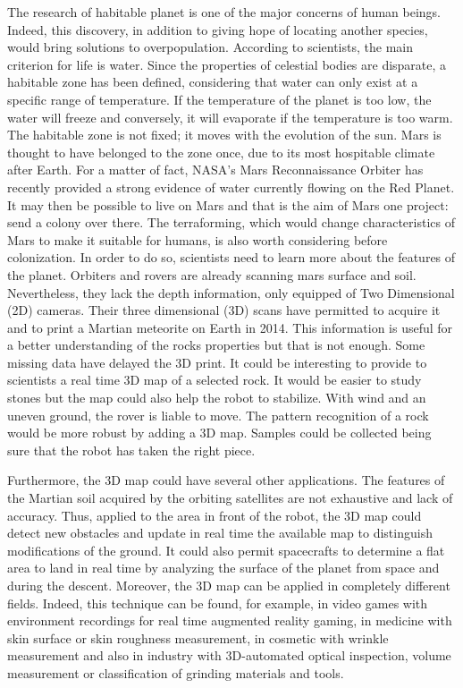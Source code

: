 The research of habitable planet is one of the major concerns of human beings. Indeed, this discovery, in addition to giving hope of locating another species, would bring solutions to overpopulation. According to scientists, the main criterion for life is water. Since the properties of celestial bodies are disparate, a habitable zone has been defined, considering that water can only exist at a specific range of temperature. If the temperature of the planet is too low, the water will freeze and conversely, it will evaporate if the temperature is too warm. The habitable zone is not fixed; it moves with the evolution of the sun. Mars is thought to have belonged to the zone once, due to its most hospitable climate after Earth. For a matter of fact, NASA's Mars Reconnaissance Orbiter has recently provided a strong evidence of water currently flowing on the Red Planet. It may then be possible to live on Mars and that is the aim of Mars one project: send a colony over there. The terraforming, which would change characteristics of Mars to make it suitable for humans, is also worth considering before colonization. In order to do so, scientists need to learn more about the features of the planet. Orbiters and rovers are already scanning mars surface and soil. Nevertheless, they lack the depth information, only equipped of Two Dimensional (2D) cameras. Their three dimensional (3D) scans have permitted to acquire it and to print a Martian meteorite on Earth in 2014. This information is useful for a better understanding of the rocks properties but that is not enough. Some missing data have delayed the 3D print. It could be interesting to provide to scientists a real time 3D map of a selected rock. It would be easier to study stones but the map could also help the robot to stabilize. With wind and an uneven ground, the rover is liable to move. The pattern recognition of a rock would be more robust by adding a 3D map. Samples could be collected being sure that the robot has taken the right piece. 

Furthermore, the 3D map could have several other applications. The features of the Martian soil acquired by the orbiting satellites are not exhaustive and lack of accuracy. Thus, applied to the area in front of the robot, the 3D map could detect new obstacles and update in real time the available map to distinguish modifications of the ground. It could also permit spacecrafts to determine a flat area to land in real time by analyzing the surface of the planet from space and during the descent. Moreover, the 3D map can be applied in completely different fields. Indeed, this technique can be found, for example, in video games with environment recordings for real time augmented reality gaming, in medicine with skin surface or skin roughness measurement, in cosmetic with wrinkle measurement and also in industry with 3D-automated optical inspection, volume measurement or classification of grinding materials and tools.

